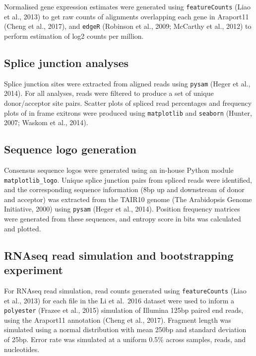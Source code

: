 \documentclass[12pt,a4paper,]{report}
\begin{document}
Normalised gene expression estimates were generated using
\texttt{featureCounts} (Liao et al., 2013) to get raw counts of
alignments overlapping each gene in Araport11 (Cheng et al., 2017), and
\texttt{edgeR} (Robinson et al., 2009; McCarthy et al., 2012) to perform
estimation of log2 counts per million.

\hypertarget{splice-junction-analyses}{%
\subsection{Splice junction analyses}\label{splice-junction-analyses}}

Splice junction sites were extracted from aligned reads using
\texttt{pysam} (Heger et al., 2014). For all analyses, reads were
filtered to produce a set of unique donor/acceptor site pairs. Scatter
plots of spliced read percentages and frequency plots of in frame
exitrons were produced using \texttt{matplotlib} and \texttt{seaborn}
(Hunter, 2007; Waskom et al., 2014).

\hypertarget{sequence-logo-generation}{%
\subsection{Sequence logo generation}\label{sequence-logo-generation}}

Consensus sequence logos were generated using an in-house Python module
\texttt{matplotlib\_logo}. Unique splice junction pairs from spliced
reads were identified, and the corresponding sequence information (8bp
up and downstream of donor and acceptor) was extracted from the TAIR10
genome (The Arabidopsis Genome Initiative, 2000) using \texttt{pysam}
(Heger et al., 2014). Position frequency matrices were generated from
these sequences, and entropy score in bits was calculated and plotted.

\hypertarget{rnaseq-read-simulation-and-bootstrapping-experiment}{%
\subsection{RNAseq read simulation and bootstrapping
experiment}\label{rnaseq-read-simulation-and-bootstrapping-experiment}}

For RNAseq read simulation, read counts generated using
\texttt{featureCounts} (Liao et al., 2013) for each file in the Li et
al.~2016 dataset were used to inform a \texttt{polyester} (Frazee et
al., 2015) simulation of Illumina 125bp paired end reads, using the
Araport11 annotation (Cheng et al., 2017). Fragment length was simulated
using a normal distribution with mean 250bp and standard deviation of
25bp. Error rate was simulated at a uniform 0.5\% across samples, reads,
and nucleotides.
\end{document}
